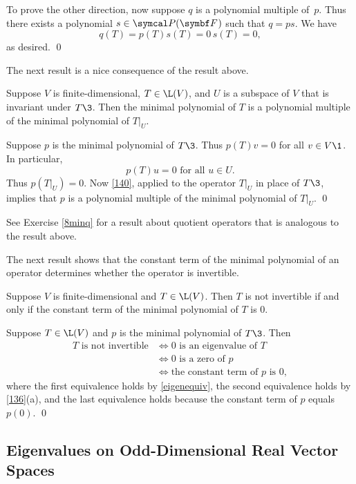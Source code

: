 To prove the other direction, now suppose $q$ is a polynomial multiple of~$p$.  Thus there exists a polynomial $s \in \P(\F{})$ such that $q = ps$.  We have
\[
q(T) = p(T)s(T) = 0 \, s(T) = 0,
\]
as desired.
\qed

The next result is a nice consequence of the result above.

{Suppose $V$ is finite-dimensional, $T \in \L(V)$, and $U$ is a subspace of $V$ that is invariant under $T\3$.
Then the minimal polynomial of $T$ is a polynomial multiple of the minimal polynomial of $T|_U$.}

\proof
Suppose $p$ is the minimal polynomial of $T\3$. Thus $p(T)v = 0$ for all $v \in V\1$. In particular,
\[
p(T)u = 0 \text{ for all } u \in U.
\]
Thus $p(T|_U) = 0$. Now \ref{140}, applied to the operator $T|_U$ in place of $T\3$, implies that $p$ is a polynomial multiple of the minimal polynomial of  $T|_U$.
\qed

See Exercise \ref{8minq} for a result about quotient operators that is analogous to the result above.

The next result shows that the constant term of the minimal polynomial of an operator determines whether the operator is invertible.

{Suppose $V$ is finite-dimensional and $T \in \L(V)$. Then $T$ is not invertible if and only if the constant term of the minimal polynomial of $T$ is $0$.}

\proof
Suppose $T \in \L(V)$ and $p$ is the minimal polynomial of $T\3$. Then
\begin{align*}
T \text{ is not invertible} &\iff 0 \text{ is an eigenvalue of } T\\
&\iff 0 \text{ is a zero of } p\\
&\iff \text{the constant term of } p \text{ is } 0,
\end{align*}
where the first equivalence holds by \ref{eigenequiv}, the second equivalence holds by \ref{136}(a), and the last equivalence holds because the constant term of $p$ equals $p(0)$.
\qed

\subsection{Eigenvalues on Odd-Dimensional Real Vector Spaces}

